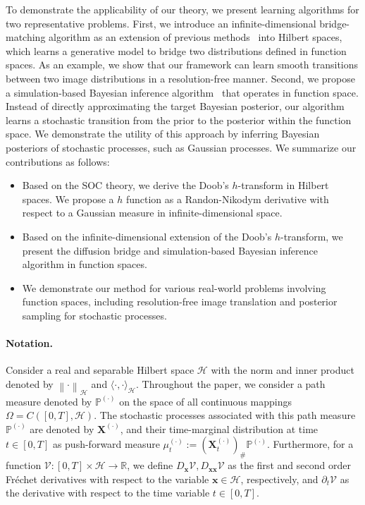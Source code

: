\documentclass[nohyperref]{article}
\theoremstyle{plain}
\theoremstyle{remark}
\newcommand{\la}{\langle}
\newcommand{\ra}{\rangle}
\newcommand{\mc}{\mathcal}
\newcommand{\mb}{\mathbf}
\newcommand{\norm}[1]{\left\lVert#1\right\rVert}
\begin{document}
To demonstrate the applicability of our theory, we present learning algorithms for two representative problems. 
First, we introduce an infinite-dimensional bridge-matching algorithm as an extension of previous methods~\citep{peluchetti2023diffusion, shi2024diffusion} into Hilbert spaces, which learns a generative model to bridge two distributions defined in function spaces. 
As an example, we show that our framework can learn smooth transitions between two image distributions in a resolution-free manner. 
Second, we propose a simulation-based Bayesian inference algorithm~\citep{zhang2022path, vargas2023bayesian} that operates in function space. Instead of directly approximating the target Bayesian posterior, our algorithm learns a stochastic transition from the prior to the posterior within the function space. We demonstrate the utility of this approach by inferring Bayesian posteriors of stochastic processes, such as Gaussian processes.
We summarize our contributions as follows:
\begin{itemize}[leftmargin=20pt]
    \item Based on the SOC theory, we derive the Doob's $h$-transform in Hilbert spaces. We propose a $h$ function as a Randon-Nikodym derivative with respect to a Gaussian measure in infinite-dimensional space.
    \item Based on the infinite-dimensional extension of the Doob's $h$-transform, we present the diffusion bridge and simulation-based Bayesian inference algorithm in function spaces.
    \item We demonstrate our method for various real-world problems involving function spaces, including resolution-free image translation and posterior sampling for stochastic processes.
\end{itemize}



\paragraph{Notation.}
Consider a real and separable Hilbert space $\mc{H}$ with the norm and inner product denoted by $\norm{\cdot}_{\mc{H}}$ and $\la \cdot, \cdot \ra_{\mc{H}}$.
Throughout the paper, we consider a path measure denoted by $\mathbb{P}^{(\cdot)}$ on the space of all continuous mappings $\Omega=C([0, T], \mc{H})$. The stochastic processes associated with this path measure $\mathbb{P}^{(\cdot)}$ are denoted by $\mb{X}^{(\cdot)}$, and their time-marginal distribution at time $t \in [0, T]$ as push-forward measure $\mu^{(\cdot)}_t := (\mb{X}^{(\cdot)}_t)_{\#}\mathbb{P}^{(\cdot)}$. 
Furthermore, for a function $\mc{V} : [0, T] \times \mc{H} \to \mathbb{R}$, we define $D_{\mb{x}}\mc{V}, D_{\mb{xx}}\mc{V}$ as the first and second order Fréchet derivatives with respect to the variable  $\mb{x} \in \mc{H}$, respectively, and $\partial_t \mc{V}$ as the derivative with respect to the time variable $t \in [0, T]$.
\end{document}
